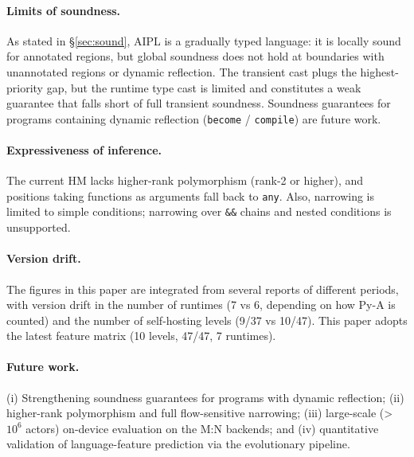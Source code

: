\documentclass[11pt,a4paper]{article}
\newcommand{\code}[1]{\texttt{\small #1}}
\begin{document}
\paragraph{Limits of soundness.}
As stated in \S\ref{sec:sound}, AIPL is a gradually typed language: it is
locally sound for annotated regions, but global soundness does not hold
at boundaries with unannotated regions or dynamic reflection. The
transient cast plugs the highest-priority gap, but the runtime type cast
is limited and constitutes a weak guarantee that falls short of full
transient soundness. Soundness guarantees for programs containing dynamic
reflection (\code{become} / \code{compile}) are future work.

\paragraph{Expressiveness of inference.}
The current HM lacks higher-rank polymorphism (rank-2 or higher), and
positions taking functions as arguments fall back to \code{any}. Also,
narrowing is limited to simple conditions; narrowing over \code{\&\&}
chains and nested conditions is unsupported.

\paragraph{Version drift.}
The figures in this paper are integrated from several reports of
different periods, with version drift in the number of runtimes (7 vs 6,
depending on how Py-A is counted) and the number of self-hosting levels
(9/37 vs 10/47). This paper adopts the latest feature matrix (10 levels,
47/47, 7 runtimes).

\paragraph{Future work.}
(i) Strengthening soundness guarantees for programs with dynamic
reflection; (ii) higher-rank polymorphism and full flow-sensitive
narrowing; (iii) large-scale (>$10^6$ actors) on-device evaluation on the
M:N backends; and (iv) quantitative validation of language-feature
prediction via the evolutionary pipeline.

\end{document}
